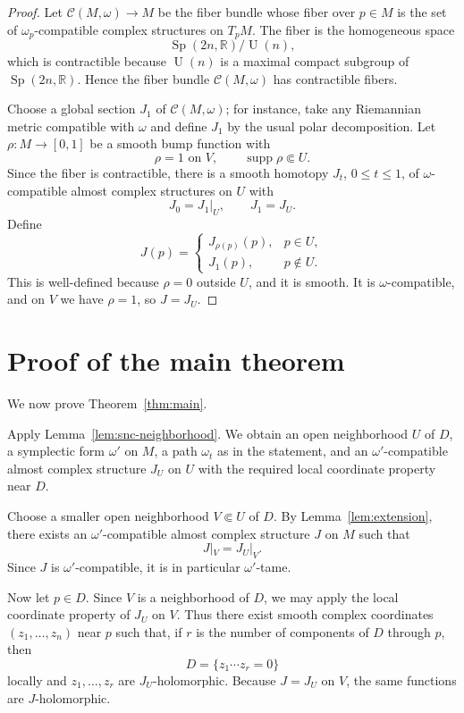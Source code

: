 \documentclass[11pt]{article}
\theoremstyle{definition}
\theoremstyle{remark}
\begin{document}
\begin{proof}
Let \(\mathcal C(M,\omega)\to M\) be the fiber bundle whose fiber over \(p\in M\) is the set of \(\omega_p\)-compatible complex structures on \(T_pM\). The fiber is the homogeneous space
\[
\operatorname{Sp}(2n,\mathbb R)/\operatorname{U}(n),
\]
which is contractible because \(\operatorname{U}(n)\) is a maximal compact subgroup of \(\operatorname{Sp}(2n,\mathbb R)\). Hence the fiber bundle \(\mathcal C(M,\omega)\) has contractible fibers.

Choose a global section \(J_1\) of \(\mathcal C(M,\omega)\); for instance, take any Riemannian metric compatible with \(\omega\) and define \(J_1\) by the usual polar decomposition. Let \(\rho:M\to[0,1]\) be a smooth bump function with
\[
\rho=1\text{ on }V,\qquad \operatorname{supp}\rho\Subset U.
\]
Since the fiber is contractible, there is a smooth homotopy \(J_t\), \(0\le t\le 1\), of \(\omega\)-compatible almost complex structures on \(U\) with
\[
J_0=J_1|_U,\qquad J_1=J_U.
\]
Define
\[
J(p)=
\begin{cases}
J_{\rho(p)}(p),&p\in U,\\
J_1(p),&p\notin U.
\end{cases}
\]
This is well-defined because \(\rho=0\) outside \(U\), and it is smooth. It is \(\omega\)-compatible, and on \(V\) we have \(\rho=1\), so \(J=J_U\).
\end{proof}

\section{Proof of the main theorem}

We now prove Theorem~\ref{thm:main}.

Apply Lemma~\ref{lem:snc-neighborhood}. We obtain an open neighborhood \(U\) of \(D\), a symplectic form \(\omega'\) on \(M\), a path \(\omega_t\) as in the statement, and an \(\omega'\)-compatible almost complex structure \(J_U\) on \(U\) with the required local coordinate property near \(D\).

Choose a smaller open neighborhood \(V\Subset U\) of \(D\). By Lemma~\ref{lem:extension}, there exists an \(\omega'\)-compatible almost complex structure \(J\) on \(M\) such that
\[
J|_V=J_U|_V.
\]
Since \(J\) is \(\omega'\)-compatible, it is in particular \(\omega'\)-tame.

Now let \(p\in D\). Since \(V\) is a neighborhood of \(D\), we may apply the local coordinate property of \(J_U\) on \(V\). Thus there exist smooth complex coordinates \((z_1,\dots,z_n)\) near \(p\) such that, if \(r\) is the number of components of \(D\) through \(p\), then
\[
D=\{z_1\cdots z_r=0\}
\]
locally and \(z_1,\dots,z_r\) are \(J_U\)-holomorphic. Because \(J=J_U\) on \(V\), the same functions are \(J\)-holomorphic.
\end{document}
